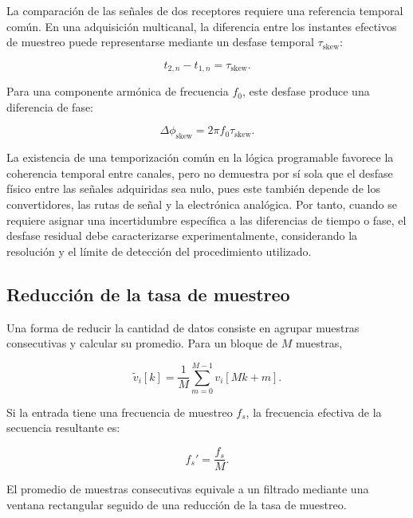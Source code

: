 La comparación de las señales de dos receptores requiere una referencia
temporal común. En una adquisición multicanal, la diferencia entre los
instantes efectivos de muestreo puede representarse mediante un desfase
temporal $\tau_{\mathrm{skew}}$:

\begin{equation}
    t_{2,n}-t_{1,n}
    =
    \tau_{\mathrm{skew}}.
    \label{eq:skew_canales}
\end{equation}

Para una componente armónica de frecuencia $f_0$, este desfase produce
una diferencia de fase:

\begin{equation}
    \Delta\phi_{\mathrm{skew}}
    =
    2\pi f_0\tau_{\mathrm{skew}}.
    \label{eq:error_fase_skew}
\end{equation}

La existencia de una temporización común en la lógica programable
favorece la coherencia temporal entre canales, pero no demuestra por sí
sola que el desfase físico entre las señales adquiridas sea nulo, pues
este también depende de los convertidores, las rutas de señal y la
electrónica analógica. Por tanto, cuando se requiere asignar una
incertidumbre específica a las diferencias de tiempo o fase, el desfase
residual debe caracterizarse experimentalmente, considerando la
resolución y el límite de detección del procedimiento utilizado.

\subsection*{Reducción de la tasa de muestreo}

Una forma de reducir la cantidad de datos consiste en agrupar muestras
consecutivas y calcular su promedio. Para un bloque de $M$ muestras,

\begin{equation}
    \tilde{v}_i[k]
    =
    \frac{1}{M}
    \sum_{m=0}^{M-1}
    v_i[Mk+m].
    \label{eq:promediado}
\end{equation}

Si la entrada tiene una frecuencia de muestreo $f_s$, la frecuencia
efectiva de la secuencia resultante es:

\begin{equation}
    f_s'
    =
    \frac{f_s}{M}.
    \label{eq:frecuencia_diezmada}
\end{equation}

El promedio de muestras consecutivas equivale a un filtrado mediante
una ventana rectangular seguido de una reducción de la tasa de muestreo.

